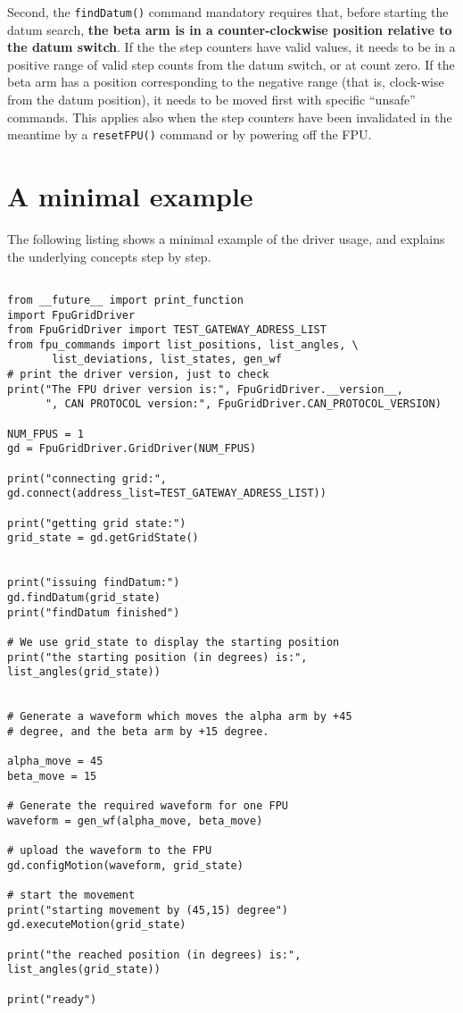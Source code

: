 \documentclass{scrartcl}[12pt,a4paper]
\begin{document}
Second, the \texttt{findDatum()} command mandatory requires that,
before starting the datum search, \textbf{the beta arm is in a
  counter-clockwise position relative to the datum switch}. If the the
step counters have valid values, it needs to be in a positive range of
valid step counts from the datum switch, or at count zero. If the beta
arm has a position corresponding to the negative range (that is,
clock-wise from the datum position), it needs to be moved first with
specific ``unsafe'' commands.  This applies also when the step
counters have been invalidated in the meantime by a
\texttt{resetFPU()} command or by powering off the FPU.


\section{A minimal example}
\label{sec:minimalexample}
The following listing shows a minimal example of the
driver usage, and explains the underlying concepts
step by step.

\begin{verbatim}

from __future__ import print_function
import FpuGridDriver
from FpuGridDriver import TEST_GATEWAY_ADRESS_LIST
from fpu_commands import list_positions, list_angles, \
       list_deviations, list_states, gen_wf
# print the driver version, just to check
print("The FPU driver version is:", FpuGridDriver.__version__,
      ", CAN PROTOCOL version:", FpuGridDriver.CAN_PROTOCOL_VERSION)

NUM_FPUS = 1
gd = FpuGridDriver.GridDriver(NUM_FPUS)

print("connecting grid:", gd.connect(address_list=TEST_GATEWAY_ADRESS_LIST))

print("getting grid state:")
grid_state = gd.getGridState()


print("issuing findDatum:")
gd.findDatum(grid_state)
print("findDatum finished")

# We use grid_state to display the starting position
print("the starting position (in degrees) is:", list_angles(grid_state))


# Generate a waveform which moves the alpha arm by +45
# degree, and the beta arm by +15 degree. 

alpha_move = 45
beta_move = 15

# Generate the required waveform for one FPU
waveform = gen_wf(alpha_move, beta_move)

# upload the waveform to the FPU
gd.configMotion(waveform, grid_state)

# start the movement
print("starting movement by (45,15) degree")
gd.executeMotion(grid_state)

print("the reached position (in degrees) is:", list_angles(grid_state))

print("ready")

\end{verbatim}
\end{document}
